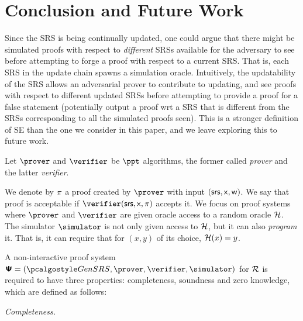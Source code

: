\documentclass{llncs}
\newcommand{\ourpar}[1] {\smallskip\noindent\emph{#1}}
\begin{document}
\section{Conclusion and Future Work}

Since the SRS is being continually updated, one could argue that there might be
simulated proofs with respect to \textit{different} SRSs available for the adversary
to see before attempting to forge a proof with respect to a current SRS.  That is,
each SRS in the update chain spawns a simulation oracle. Intuitively, the
updatability of the SRS allows an adversarial prover to contribute to updating, and
see proofs with respect to different updated SRSs before attempting to provide a
proof for a false statement (potentially output a proof wrt a SRS that is different
from the SRSs corresponding to all the simulated proofs seen).  This is a stronger
definition of SE than the one we consider in this paper, and we leave exploring this
to future work.




\appendix



%


%
%

\iffalse
Let $\prover$ and $\verifier$ be $\ppt$ algorithms, the former called \emph{prover}
and the latter \emph{verifier}. 

We denote by $\pi$ a proof created by $\prover$ with input
$(\mathsf{srs}, \mathsf{x}, \mathsf{w})$. We say that proof is acceptable if $\verifier (\srs, \inp,
\zkproof)$ accepts it. We focus on proof systems where $\prover$ and
$\verifier$ are given oracle access to a random oracle $\mathcal{H}$. The simulator
$\simulator$ is not only given access to $\mathcal{H}$, but it can also \emph{program}
it. That is, it can require that for $(x, y)$ of its choice, $\mathcal{H} (x) = y$.

A non-interactive  proof system $\proofsystem = (\kgen, \prover, \verifier, \simulator)$ for $\mathcal{R}$ is
required to have three properties: completeness, soundness and zero knowledge, which are
defined as follows:

\ourpar{Completeness.}
\end{document}
